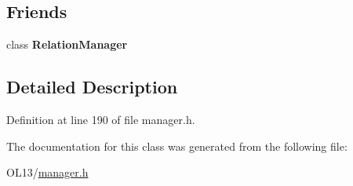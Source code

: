 \subsection*{Friends}
\begin{DoxyCompactItemize}
\item 
\mbox{\label{class_relation_manager_1_1_iterator_a55fae9c2e48742dd0a8596e6d8721775}} 
class {\bfseries Relation\+Manager}
\end{DoxyCompactItemize}


\subsection{Detailed Description}


Definition at line 190 of file manager.\+h.



The documentation for this class was generated from the following file\+:\begin{DoxyCompactItemize}
\item 
O\+L13/\hyperlink{manager_8h}{manager.\+h}\end{DoxyCompactItemize}
